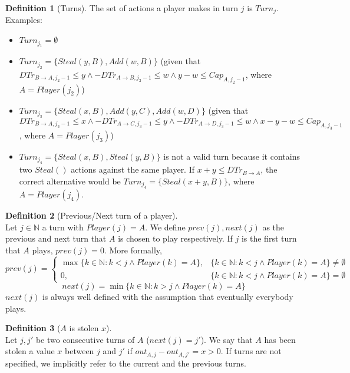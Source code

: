 \documentclass[11pt]{article}
\theoremstyle{definition}
\newtheorem{definition}{Definition}[section]
\theoremstyle{corollary}
\theoremstyle{lemma}
\begin{document}
\begin{definition}[Turns]
         The set of actions a player makes in turn $j$ is $Turn_j$. Examples:
         \begin{itemize}
            \item $Turn_{j_1} = \emptyset$
            \item $Turn_{j_2} = \{Steal(y, B), Add(w, B)\}$ (given that $DTr_{B \rightarrow A, j_2 - 1} \leq y \wedge
            -DTr_{A \rightarrow B, j_2 - 1} \leq w \wedge y - w \leq Cap_{A, j_2-1}$, where $A = Player(j_2)$)
            \item $Turn_{j_3} = \{Steal(x, B), Add(y, C), Add(w, D)\}$ (given that $DTr_{B \rightarrow A, j_3 - 1} \leq x
            \wedge -DTr_{A \rightarrow C, j_3-1} \leq y \wedge -DTr_{A \rightarrow D, j_3 - 1} \leq w \wedge
            x - y - w \leq Cap_{A, j_3-1}$, where $A = Player(j_3)$)
            \item $Turn_{j_4} = \{Steal(x, B), Steal(y, B)\}$ is not a valid turn because it contains two $Steal()$ actions
            against the same player. If $x + y \leq DTr_{B \rightarrow A}$, the correct alternative would be $Turn_{j_4} =
            \{Steal(x+y, B)\}$, where $A = Player(j_4)$.
         \end{itemize}
      \end{definition}
      \begin{definition}[Previous/Next turn of a player] \ \\
         Let $j \in \mathbb{N}$ a turn with $Player(j) = A$. We define $prev(j), next(j)$ as the previous and next turn
         that $A$ is chosen to play respectively. If $j$ is the first turn that $A$ plays, $prev(j) = 0$. More formally,
         $$prev(j) = \begin{cases}
            \max{\{k \in \mathbb{N} : k < j \wedge Player(k) = A\}}, & \{k \in \mathbb{N} : k < j \wedge Player(k) = A\}
            \neq \emptyset \\
            0, & \{k \in \mathbb{N} : k < j \wedge Player(k) = A\} = \emptyset
         \end{cases}$$
         $$next(j) = \min{\{k \in \mathbb{N} : k > j \wedge Player(k) = A\}}$$
         $next(j)$ is always well defined with the assumption that eventually everybody plays.
      \end{definition}
      \begin{definition}[$A$ is stolen $x$] \ \\
         Let $j, j'$ be two consecutive turns of $A$ ($next(j) = j'$). We say that $A$ has been stolen a value $x$ between
         $j$ and $j'$ if $out_{A,j} - out_{A,j'} = x > 0$. If turns are not specified, we implicitly refer to the current
         and the previous turns.
      \end{definition}
\end{document}
